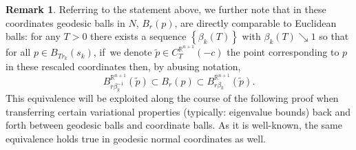 \documentclass[10pt]{amsart}
\theoremstyle{definition}
\newtheorem{rmk}[thm]{Remark}
\newcommand{\R}{\mathbb{R}}
\begin{document}
\begin{rmk}\label{rmk:equivballs}
Referring to the statement above, we further note that in these coordinates geodesic balls in $N$, $B_r(p)$, are directly comparable to Euclidean balls: for any $T>0$ there exists a sequence $\left\{\beta_k(T)\right\}$ with $\beta_k(T) \searrow 1$ so that for all $p\in B_{Tr_k}(s_k)$, if~we denote $\widetilde{p}\in C^{\R^{n+1}}_{T}(-c)$ the point corresponding to $p$ in these rescaled coordinates then, by abusing notation,
$$B^{\R^{n+1}}_{r\beta_k^{-1}}(\widetilde{p}) \subset B_r(p)\subset B^{\R^{n+1}}_{r \beta_k}(\widetilde{p}).$$
This equivalence will be exploited along the course of the following proof when transferring certain variational properties (typically: eigenvalue bounds) back and forth between geodesic balls and coordinate balls. As it is well-known, the same equivalence holds true in geodesic normal coordinates as well.
\end{rmk}
\end{document}
